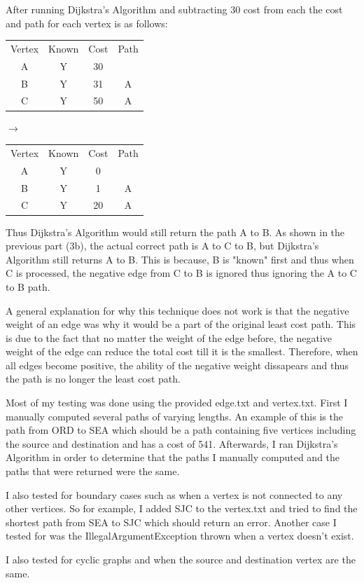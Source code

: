 \documentclass[12pt]{exam}
\begin{document}
\begin{questions}
\begin{parts}
After running Dijkstra's Algorithm and subtracting 30 cost from each the cost and path for each vertex is as follows: 

\begin{tabular}{| c c c c |}
\hline
Vertex & Known & Cost & Path \\
A & Y & 30 & \\
B & Y & 31 & A \\
C & Y & 50 & A \\
\hline
\end{tabular}
$\rightarrow$
\begin{tabular}{| c c c c |}
\hline
Vertex & Known & Cost & Path \\
A & Y & 0 & \\
B & Y & 1 & A \\
C & Y & 20 & A \\
\hline
\end{tabular}

Thus Dijkstra's Algorithm would still return the path A to B. As shown in the previous part (3b), the actual correct path is A to C to B, but Dijkstra's Algorithm still returns A to B. This is because, B is "known" first and thus when C is processed, the negative edge from C to B is ignored thus ignoring the A to C to B path.

A general explanation for why this technique does not work is that the negative weight of an edge was why it would be a part of the original least cost path. This is due to the fact that no matter the weight of the edge before, the negative weight of the edge can reduce the total cost till it is the smallest. Therefore, when all edges become positive, the ability of the negative weight dissapears and thus the path is no longer the least cost path.

\end{parts}


Most of my testing was done using the provided edge.txt and vertex.txt. First I manually computed several paths of varying lengths. An example of this is the path from ORD to SEA which should be a path containing five vertices including the source and destination and has a cost of 541. Afterwards, I ran Dijkstra's Algorithm in order to determine that the paths I manually computed and the paths that were returned were the same. 

I also tested for boundary cases such as when a vertex is not connected to any other vertices. So for example, I added SJC to the vertex.txt and tried to find the shortest path from SEA to SJC which should return an error. Another case I tested for was the IllegalArgumentException thrown when a vertex doesn't exist.

I also tested for cyclic graphs and when the source and destination vertex are the same. 


\end{questions}
\end{document}
